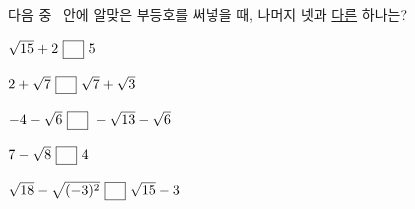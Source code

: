 다음 중 \blank\ 안에 알맞은 부등호를 써넣을 때, 나머지 넷과 \underline{다른} 하나는?
\begin{choicesv}{\rule[-3ex]{0pt}{8ex}$\sqrt{15}+2\ \blank\ 5$}{\rule[-3ex]{0pt}{8ex}$2+\sqrt{7}\ \blank\ \sqrt{7}+\sqrt{3}$}{\rule[-3ex]{0pt}{8ex}$-4-\sqrt{6}\ \blank\ -\sqrt{13}-\sqrt{6}$}{\rule[-3ex]{0pt}{8ex}$7-\sqrt{8}\ \blank\ 4$}{\rule[-3ex]{0pt}{8ex}$\sqrt{18}-\sqrt{(-3)^2}\ \blank\ \sqrt{15}-3$}\end{choicesv}
